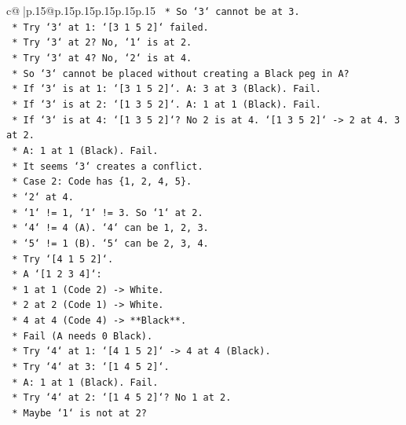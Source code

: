 \documentclass{article}
\begin{document}
{\begin{supertabular}{c@{$\;$}|p{.15\linewidth}@{}p{.15\linewidth}p{.15\linewidth}p{.15\linewidth}p{.15\linewidth}p{.15\linewidth}}
{{{\texttt{                *   So `3` cannot be at 3.} \\
\texttt{            *   Try `3` at 1: `{[}3 1 5 2{]}` failed.} \\
\texttt{            *   Try `3` at 2? No, `1` is at 2.} \\
\texttt{            *   Try `3` at 4? No, `2` is at 4.} \\
\texttt{            *   So `3` cannot be placed without creating a Black peg in A?} \\
\texttt{            *   If `3` is at 1: `{[}3 1 5 2{]}`. A: 3 at 3 (Black). Fail.} \\
\texttt{            *   If `3` is at 2: `{[}1 3 5 2{]}`. A: 1 at 1 (Black). Fail.} \\
\texttt{            *   If `3` is at 4: `{[}1 3 5 2{]}`? No 2 is at 4. `{[}1 3 5 2{]}` {-}> 2 at 4. 3 at 2.} \\
\texttt{                *   A: 1 at 1 (Black). Fail.} \\
\texttt{            *   It seems `3` creates a conflict.} \\
\texttt{    *   Case 2: Code has \{1, 2, 4, 5\}.} \\
\texttt{        *   `2` at 4.} \\
\texttt{        *   `1` != 1, `1` != 3. So `1` at 2.} \\
\texttt{        *   `4` != 4 (A). `4` can be 1, 2, 3.} \\
\texttt{        *   `5` != 1 (B). `5` can be 2, 3, 4.} \\
\texttt{        *   Try `{[}4 1 5 2{]}`.} \\
\texttt{            *   A `{[}1 2 3 4{]}`:} \\
\texttt{                *   1 at 1 (Code 2) {-}> White.} \\
\texttt{                *   2 at 2 (Code 1) {-}> White.} \\
\texttt{                *   4 at 4 (Code 4) {-}> **Black**.} \\
\texttt{                *   Fail (A needs 0 Black).} \\
\texttt{        *   Try `4` at 1: `{[}4 1 5 2{]}` {-}> 4 at 4 (Black).} \\
\texttt{        *   Try `4` at 3: `{[}1 4 5 2{]}`.} \\
\texttt{            *   A: 1 at 1 (Black). Fail.} \\
\texttt{        *   Try `4` at 2: `{[}1 4 5 2{]}`? No 1 at 2.} \\
\texttt{        *   Maybe `1` is not at 2?} \\
}}}
\end{supertabular}}
\end{document}
